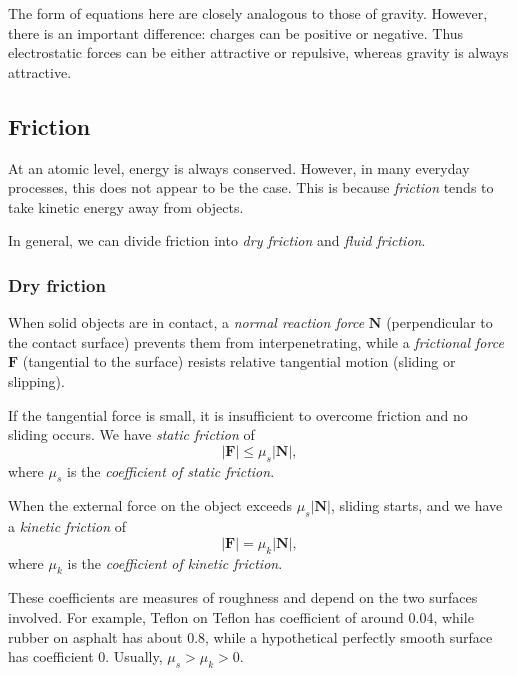 \documentclass[a4paper]{article}
\begin{document}
The form of equations here are closely analogous to those of gravity. However, there is an important difference: charges can be positive or negative. Thus electrostatic forces can be either attractive or repulsive, whereas gravity is always attractive.

\subsection{Friction}
At an atomic level, energy is always conserved. However, in many everyday processes, this does not appear to be the case. This is because \emph{friction} tends to take kinetic energy away from objects.

In general, we can divide friction into \emph{dry friction} and \emph{fluid friction}.
\subsubsection*{Dry friction}
When solid objects are in contact, a \emph{normal reaction force} $\mathbf{N}$ (perpendicular to the contact surface) prevents them from interpenetrating, while a \emph{frictional force} $\mathbf{F}$ (tangential to the surface) resists relative tangential motion (sliding or slipping).
\begin{center}
\end{center}
If the tangential force is small, it is insufficient to overcome friction and no sliding occurs. We have \emph{static friction} of
\[
  |\mathbf{F}| \leq \mu_s |\mathbf{N}|,
\]
where $\mu_s$ is the \emph{coefficient of static friction}.

When the external force on the object exceeds $\mu_s |\mathbf{N}|$, sliding starts, and we have a \emph{kinetic friction} of
\[
  |\mathbf{F}| = \mu_k |\mathbf{N}|,
\]
where $\mu_k$ is the \emph{coefficient of kinetic friction}.

These coefficients are measures of roughness and depend on the two surfaces involved. For example, Teflon on Teflon has coefficient of around 0.04, while rubber on asphalt has about 0.8, while a hypothetical perfectly smooth surface has coefficient $0$. Usually, $\mu_s > \mu_k > 0$.
\end{document}
